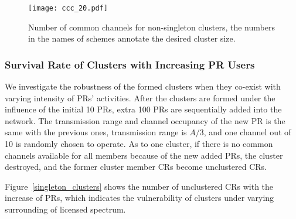 \begin{figure}[ht!]
  \centering
  \texttt{[image: ccc\_20.pdf]}
  \caption{Number of common channels for non-singleton clusters, the numbers in the names of schemes annotate the desired cluster size.}
  \label{ccc_per_nonsingleton}
\end{figure}

\subsubsection*{Survival Rate of Clusters with Increasing PR Users}
We investigate the robustness of the formed clusters when they co-exist with varying intensity of PRs' activities.
After the clusters are formed under the influence of the initial 10 PRs, extra 100 PRs are sequentially added into the network.
The transmission range and channel occupancy of the new PR is the same with the previous ones, \ie transmission range is $A/3$, and one channel out of 10 is randomly chosen to operate.
As to one cluster, if there is no common channels available for all members because of the new added PRs, the cluster destroyed, and the former cluster member CRs become unclustered CRs.

Figure~\ref{singleton_clusters} shows the number of unclustered CRs with the increase of PRs, which indicates the vulnerability of clusters under varying surrounding of licensed spectrum.


